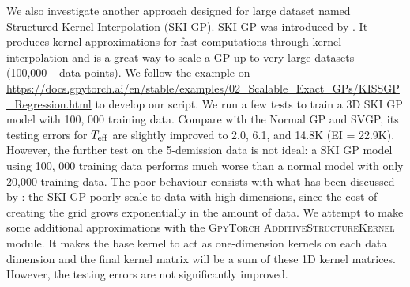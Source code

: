We also investigate another approach designed for large dataset named Structured Kernel Interpolation (SKI GP). SKI GP was introduced by \citet{wilson2015kernel}. It produces kernel approximations for fast computations through kernel interpolation and is a great way to scale a GP up to very large datasets (100,000+ data points).
We follow the example on \url{https://docs.gpytorch.ai/en/stable/examples/02_Scalable_Exact_GPs/KISSGP_Regression.html} to develop our script. 
We run a few tests to train a 3D SKI GP model with 100, 000 training data. Compare with the Normal GP and SVGP, its testing errors for $T_{\rm eff}$ are slightly improved to 2.0, 6.1, and 14.8K (EI = 22.9K). However, the further test on the 5-demission data is not ideal: a SKI GP model using 100, 000 training data performs much worse than a normal model with only 20,000 training data. The poor behaviour consists with what has been discussed by \citet{wilson2015kernel}: the SKI GP poorly scale to data with high dimensions, since the cost of creating the grid grows exponentially in the amount of data. We attempt to make some additional approximations with the \textsc{GpyTorch AdditiveStructureKernel} module. It makes the base kernel to act as one-dimension kernels on each data dimension and the final kernel matrix will be a sum of these 1D kernel matrices. However, the testing errors are not significantly improved. 





